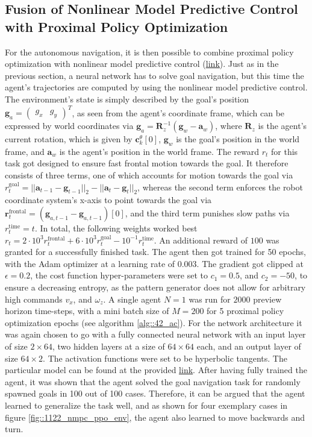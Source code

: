 \subsection{Fusion of Nonlinear Model Predictive Control with Proximal Policy Optimization}
\label{sec::1122_fpp}
For the autonomous navigation, it is then possible to combine proximal policy optimization with nonlinear model predictive control (\href{https://github.com/mhubii/nmpc_pattern_generator/blob/dev/src/train_ppo_nmpc.cpp}{\underline{link}}). Just as in the previous section, a neural network has to solve goal navigation, but this time the agent's trajectories are computed by using the nonlinear model predictive control. The environment's state is simply described by the goal's position $\bm{g}_a=\begin{pmatrix}
g_x & g_y
\end{pmatrix}^T$, as seen from the agent's coordinate frame, which can be expressed by world coordinates via $\bm{g}_a = \bm{R}^{-1}_z(\bm{g}_w-\bm{a}_w)$, where $\bm{R}_z$ is the agent's current rotation, which is given by $\bm{c}_k^\theta[0]$, $\bm{g}_w$ is the goal's position in the world frame, and $\bm{a}_w$ is the agent's position in the world frame. The reward $r_t$ for this task got designed to ensure fast frontal motion towards the goal. It therefore consists of three terms, one of which accounts for motion towards the goal via $r_t^\text{goal} = ||\bm{a}_{t-1}-\bm{g}_{t-1}||_2 - ||\bm{a}_t-\bm{g}_t||_2$, whereas the second term enforces the robot coordinate system's x-axis to point towards the goal via $\bm{r}_t^\text{frontal} = (\bm{g}_{a,t-1}-\bm{g}_{a,t-1})[0]$, and the third term punishes slow paths via $r_t^\text{time}=t$. In total, the following weights worked best $r_t=2\cdot10^3r_t^\text{frontal}+6\cdot10^3r_t^\text{goal}-10^{-1}r_t^\text{time}$. An additional reward of $100$ was granted for a successfully finished task. The agent then got trained for 50 epochs, with the Adam optimizer at a learning rate of 0.003. The gradient got clipped at $\epsilon=0.2$, the cost function hyper-parameters were set to $c_1=0.5$, and $c_2=-50$, to ensure a decreasing entropy, as the pattern generator does not allow for arbitrary high commands $v_x$, and $\omega_z$. A single agent $N=1$ was run for $2000$ preview horizon time-steps, with a mini batch size of $M=200$ for 5 proximal policy optimization epochs (see algorithm \ref{alg::42_ac}). For the network architecture it was again chosen to go with a fully connected neural network with an input layer of size $2\times64$, two hidden layers at a size of $64\times64$ each, and an output layer of size $64\times2$. The activation functions were set to be hyperbolic tangents. The particular model can be found at the provided \href{https://github.com/mhubii/nmpc_pattern_generator/blob/df058feeb5ba3afd88f2a855e5af148d25c23020/libs/learning/include/learning/models.h#L100}{\underline{link}}. After having fully trained the agent, it was shown that the agent solved the goal navigation task for randomly spawned goals in 100 out of 100 cases. Therefore, it can be argued that the agent learned to generalize the task well, and as shown for four exemplary cases in figure \ref{fig::1122_nmpc_ppo_env}, the agent also learned to move backwards and turn. 
